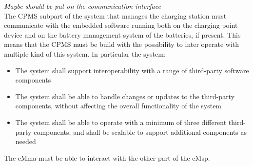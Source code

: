 \textit{Maybe should be put on the communication interface}\\
The CPMS subpart of the system that manages the charging station must communicate with the embedded software running both on the charging point device and on the battery management system of the batteries, if present. This means that the CPMS must be build with the possibility to inter operate with multiple kind of this system. In particular the system:
\begin{itemize} 
    \item The system shall support interoperability with a range of third-party software components
    \item The system shall be able to handle changes or updates to the third-party components, without affecting the overall functionality of the system
    \item The system shall be able to operate with a minimum of three different third-party components, and shall be scalable to support additional components as needed
\end{itemize}

The eMma must be able to interact with the other part of the eMsp. 